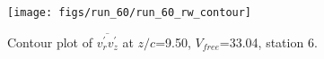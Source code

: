 \begin{figure}[H]
\centering
\texttt{[image: figs/run\_60/run\_60\_rw\_contour]}
\caption{Contour plot of $\overline{v_{r}^{\prime} v_{z}^{\prime}}$ at $z/c$=9.50, $V_{free}$=33.04, station 6.}
\label{fig:run_60_rw_contour}
\end{figure}


